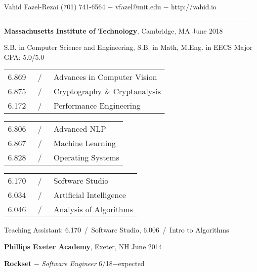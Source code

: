 \documentclass[11pt]{article}
\newcommand{\msection}[1]{\vspace{1em}\marginnote{#1}} %
\newcommand{\bt}[1]{\textbf{#1}} %
\newcommand{\gap}[0]{\vspace{0.7em}} %
\newcommand{\sgap}[0]{\vspace{0.2em}} %
\newcommand{\dash}[0]{ $-$ } %
\newcommand{\tabsep}[0]{\, / \,} %
\begin{document}

{\Huge Vahid Fazel-Rezai} \hfill  (701) 741-6564\dash vfazel@mit.edu\dash http://vahid.io

\vspace{0.4em}

\hspace{-1.2in}\rule{7.9in}{0.2em}

\vspace{-0.2em}



\msection{Education}

\bt{Massachusetts Institute of Technology}, Cambridge, MA \hfill June 2018

S.B. in Computer Science and Engineering, S.B. in Math, M.Eng. in EECS \hfill Major GPA: 5.0/5.0

\sgap

\vspace{0.15em}
\begin{tabular}{rcl}
6.869 & \tabsep & Advances in Computer Vision \\
6.875 & \tabsep & Cryptography \& Cryptanalysis \\
6.172 & \tabsep & Performance Engineering \\
\end{tabular}
\hfill
\begin{tabular}{rcl}
6.806 & \tabsep & Advanced NLP \\
6.867 & \tabsep & Machine Learning \\
6.828 & \tabsep & Operating Systems \\
\end{tabular}
\hfill
\begin{tabular}{rcl}
6.170 & \tabsep & Software Studio \\
6.034 & \tabsep & Artificial Intelligence \\
6.046 & \tabsep & Analysis of Algorithms \\
\end{tabular}

\sgap

Teaching Assistant: 6.170\tabsep Software Studio, 6.006\tabsep Intro to Algorithms

\gap

\bt{Phillips Exeter Academy}, Exeter, NH \hfill June 2014



\msection{Work}

\bt{Rockset}\dash \emph{Software Engineer} \hfill 6/18$-$expected
\end{document}
